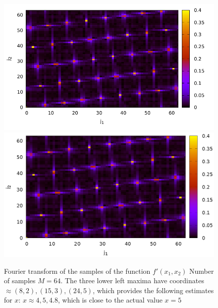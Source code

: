 \begin{figure}
\centering

\ifpdf
\includegraphics[angle=0]
{./part4/quantcomp/picellipticdiscretlog2.pdf}
\else
\includegraphics[angle=0]
{./part4/quantcomp/picellipticdiscretlog2.eps}
\fi

%

\caption{Fourier transform of the samples of the function 
$f'(x_1, x_2)$
Number of samples $M=64$. The three lower left maxima have coordinates $\approx (8,2), (15,3), (24,5)$, which provides the following estimates for $x$: $x \approx 4, 5, 4.8$,
which is close to the actual value $x = 5$
} 
\label{fig:part4:quantcomp:dle2}
\end{figure}